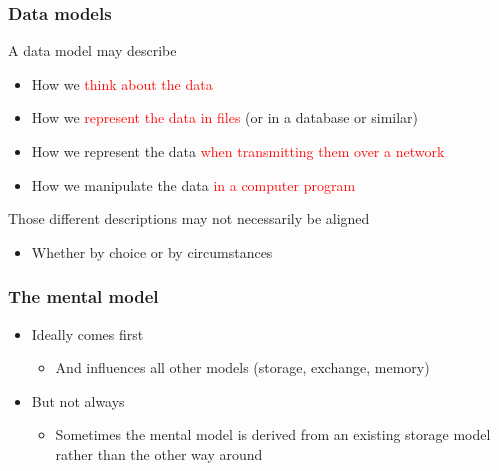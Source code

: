 \begin{frame}
  \frametitle{Data models}

  A data model may describe
  \begin{itemize}
    \item How we \textcolor<2>{red}{think about the data}
    \item How we \textcolor<3>{red}{represent the data in files} (or in a database or similar)
    \item How we represent the data \textcolor<4>{red}{when transmitting them over a network}
    \item How we manipulate the data \textcolor<5>{red}{in a computer program}
  \end{itemize}


  \bigskip
  Those different descriptions may not necessarily be aligned
  \begin{itemize}
    \item Whether by choice or by circumstances
  \end{itemize}
\end{frame}

\begin{frame}
  \frametitle{The mental model}

  \begin{itemize}
    \item Ideally comes first
      \begin{itemize}
        \item And influences all other models (storage, exchange, memory)
      \end{itemize}
    \item But not always
      \begin{itemize}
        \item Sometimes the mental model is derived from an existing storage
              model rather than the other way around
      \end{itemize}
  \end{itemize}
\end{frame}


